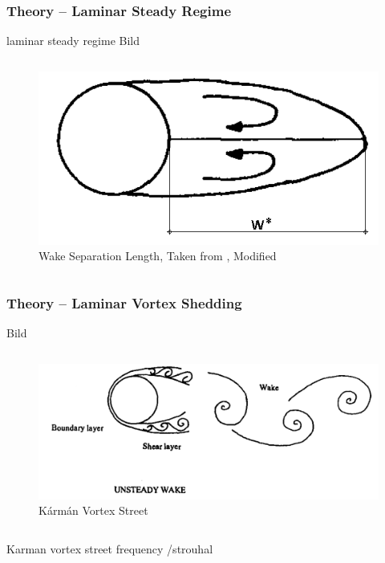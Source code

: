 	\begin{frame}
		\frametitle{Theory -- Laminar Steady Regime}
		laminar steady regime
		Bild
		\begin{columns}[t]
		\column[]{7cm}
		\column[]{5cm}
		\begin{figure}[htbp]
			\vspace{-1cm}
			\includegraphics[width=\textwidth]{img/steadyFlow_modifiedWilliamson.PNG}
			\caption{Wake Separation Length, Taken from \cite{williamson1996vortex}, Modified }
			\label{fig:wakeSeparation}
		\end{figure} 
		\end{columns}

	\end{frame}	
	\begin{frame}
		\frametitle{Theory -- Laminar Vortex Shedding}
		Bild
		\begin{columns}[t]
			\column[]{5cm}
			\column[]{7cm}
			\begin{figure}[htbp]
				\vspace{-1cm}
				\includegraphics[width=\textwidth]{img/unsteady_Williamson.PNG}
				\caption{Kármán Vortex Street \cite{williamson1996vortex} }
				\label{fig:unsteady}
			\end{figure} 
		\end{columns}
		Karman vortex street
		frequency /strouhal
	\end{frame}	

